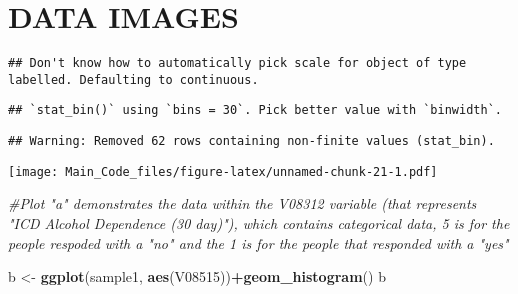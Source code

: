 \documentclass[]{article}
\newenvironment{Shaded}{\begin{snugshade}}{\end{snugshade}}
\newcommand{\KeywordTok}[1]{\textcolor[rgb]{0.13,0.29,0.53}{\textbf{#1}}}
\newcommand{\DecValTok}[1]{\textcolor[rgb]{0.00,0.00,0.81}{#1}}
\newcommand{\StringTok}[1]{\textcolor[rgb]{0.31,0.60,0.02}{#1}}
\newcommand{\CommentTok}[1]{\textcolor[rgb]{0.56,0.35,0.01}{\textit{#1}}}
\newcommand{\OperatorTok}[1]{\textcolor[rgb]{0.81,0.36,0.00}{\textbf{#1}}}
\newcommand{\NormalTok}[1]{#1}
\begin{document}
\section{DATA IMAGES}\label{data-images}

\begin{Shaded}
\end{Shaded}

\begin{verbatim}
## Don't know how to automatically pick scale for object of type labelled. Defaulting to continuous.
\end{verbatim}

\begin{verbatim}
## `stat_bin()` using `bins = 30`. Pick better value with `binwidth`.
\end{verbatim}

\begin{verbatim}
## Warning: Removed 62 rows containing non-finite values (stat_bin).
\end{verbatim}

\texttt{[image: Main\_Code\_files/figure-latex/unnamed-chunk-21-1.pdf]}

\begin{Shaded}
\begin{Highlighting}[]
\CommentTok{#Plot "a" demonstrates the data within the V08312 variable (that represents "ICD Alcohol Dependence (30 day)"), which contains categorical data, 5 is for the people respoded with a "no" and the 1 is for the people that responded with a "yes"}
\end{Highlighting}
\end{Shaded}

\begin{Shaded}
\begin{Highlighting}[]
\NormalTok{b <-}\StringTok{ }\KeywordTok{ggplot}\NormalTok{(sample1, }\KeywordTok{aes}\NormalTok{(V08515))}\OperatorTok{+}\KeywordTok{geom_histogram}\NormalTok{()}
\NormalTok{b}
\end{Highlighting}
\end{Shaded}
\end{document}
